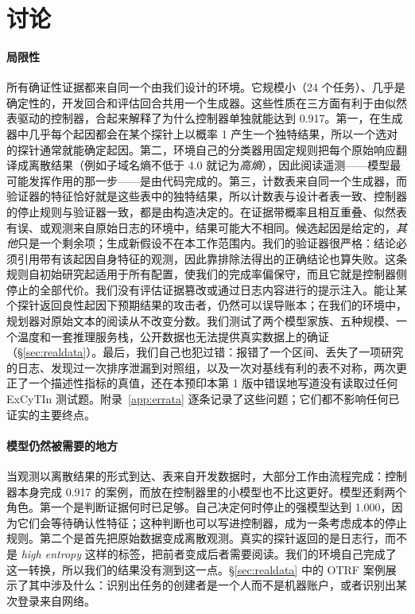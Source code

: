 \section{讨论}
\label{sec:discussion}

\paragraph{局限性} 所有确证性证据都来自同一个由我们设计的环境。它规模小（24 个任务）、几乎是确定性的，开发回合和评估回合共用一个生成器。这些性质在三方面有利于由似然表驱动的控制器，合起来解释了为什么控制器单独就能达到 0.917。第一，在生成器中几乎每个起因都会在某个探针上以概率 1 产生一个独特结果，所以一个选对的探针通常就能确定起因。第二，环境自己的分类器用固定规则把每个原始响应翻译成离散结果（例如子域名熵不低于 4.0 就记为\textit{高熵}），因此阅读遥测——模型最可能发挥作用的那一步——是由代码完成的。第三，计数表来自同一个生成器，而验证器的特征恰好就是这些表中的独特结果，所以计数表与设计者表一致、控制器的停止规则与验证器一致，都是由构造决定的。在证据带概率且相互重叠、似然表有误、或观测来自原始日志的环境中，结果可能大不相同。候选起因是给定的，\textit{其他}只是一个剩余项；生成新假设不在本工作范围内。我们的验证器很严格：结论必须引用带有该起因自身特征的观测，因此靠排除法得出的正确结论也算失败。这条规则自初始研究起适用于所有配置，使我们的完成率偏保守，而且它就是控制器侧停止的全部代价。我们没有评估证据篡改或通过日志内容进行的提示注入。能让某个探针返回良性起因下预期结果的攻击者，仍然可以误导账本；在我们的环境中，规划器对原始文本的阅读从不改变分数。我们测试了两个模型家族、五种规模、一个温度和一套推理服务栈，公开数据也无法提供真实数据上的确证（\S\ref{sec:realdata}）。最后，我们自己也犯过错：报错了一个区间、丢失了一项研究的日志、发现过一次排序泄漏到对照组，以及一次对基线有利的表不对称，两次更正了一个描述性指标的真值，还在本预印本第 1 版中错误地写道没有读取过任何 ExCyTIn 测试题。附录~\ref{app:errata} 逐条记录了这些问题；它们都不影响任何已证实的主要终点。

\paragraph{模型仍然被需要的地方} 当观测以离散结果的形式到达、表来自开发数据时，大部分工作由流程完成：控制器本身完成 0.917 的案例，而放在控制器里的小模型也不比这更好。模型还剩两个角色。第一个是判断证据何时已足够。自己决定何时停止的强模型达到 1.000，因为它们会等待确认性特征；这种判断也可以写进控制器，成为一条考虑成本的停止规则。第二个是首先把原始数据变成离散观测。真实的探针返回的是日志行，而不是 \textit{high entropy} 这样的标签，把前者变成后者需要阅读。我们的环境自己完成了这一转换，所以我们的结果没有测到这一点。\S\ref{sec:realdata} 中的 OTRF 案例展示了其中涉及什么：识别出任务的创建者是一个人而不是机器账户，或者识别出某次登录来自网络。

